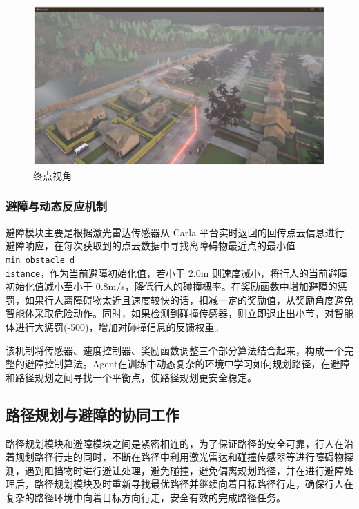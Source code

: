 \begin{figure}[H]
	\centering
	\includegraphics[width=1\textwidth]{images/nav_perspective2.pdf}
	\caption{终点视角}
	\label{fig:perspective}
\end{figure}
	
\subsubsection{避障与动态反应机制}

避障模块主要是根据激光雷达传感器从 Carla 平台实时返回的回传点云信息进行避障响应，在每次获取到的点云数据中寻找离障碍物最近点的最小值\texttt{min\_obstacle\_d\\istance}，作为当前避障初始化值，若小于 2.0m 则速度减小，将行人的当前避障初始化值减小至小于 0.8m/s，降低行人的碰撞概率。在奖励函数中增加避障的惩罚，如果行人离障碍物太近且速度较快的话，扣减一定的奖励值，从奖励角度避免智能体采取危险动作。同时，如果检测到碰撞传感器，则立即退止出小节，对智能体进行大惩罚(-500)，增加对碰撞信息的反馈权重。

该机制将传感器、速度控制器、奖励函数调整三个部分算法结合起来，构成一个完整的避障控制算法。Agent在训练中动态复杂的环境中学习如何规划路径，在避障和路径规划之间寻找一个平衡点，使路径规划更安全稳定。
	
\subsection{路径规划与避障的协同工作}
	
路径规划模块和避障模块之间是紧密相连的，为了保证路径的安全可靠，行人在沿着规划路径行走的同时，不断在路径中利用激光雷达和碰撞传感器等进行障碍物探测，遇到阻挡物时进行避让处理，避免碰撞，避免偏离规划路径，并在进行避障处理后，路径规划模块及时重新寻找最优路径并继续向着目标路径行走，确保行人在复杂的路径环境中向着目标方向行走，安全有效的完成路径任务。

